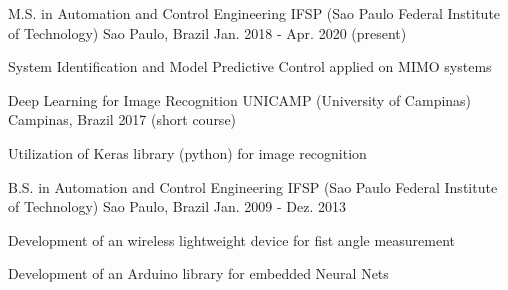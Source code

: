 

\begin{cventries}

\cventry
  {M.S. in Automation and Control Engineering} %
  {IFSP (Sao Paulo Federal Institute of Technology)} %
  {Sao Paulo, Brazil} %
  {Jan. 2018 - Apr. 2020 (present)} %
  {
    \begin{cvitems} %
      \item {System Identification and Model Predictive Control applied on MIMO systems}
    \end{cvitems}
  }

  \cventry
    {Deep Learning for Image Recognition} %
    {UNICAMP (University of Campinas)} %
    {Campinas, Brazil} %
    {2017 (short course)} %
    {
      \begin{cvitems} %
        \item {Utilization of Keras library (python) for image recognition}
      \end{cvitems}
    }

  \cventry
    {B.S. in Automation and Control Engineering} %
    {IFSP (Sao Paulo Federal Institute of Technology)} %
    {Sao Paulo, Brazil} %
    {Jan. 2009 - Dez. 2013} %
    {
      \begin{cvitems} %
        \item {Development of an wireless lightweight device for fist angle measurement}
        \item {Development of an Arduino library for embedded Neural Nets}
      \end{cvitems}
    }

\end{cventries}
